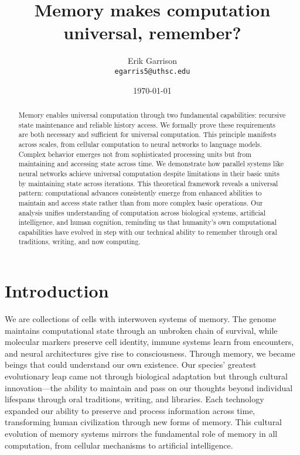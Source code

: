 \documentclass[12pt]{article}
\title{Memory makes computation universal, remember?}
\author{Erik Garrison\\
  \texttt{egarris5@uthsc.edu}\\[1ex]
  }
\date{\today}
\begin{document}
\maketitle

\begin{abstract}
Memory enables universal computation through two fundamental capabilities: recursive state maintenance and reliable history access.
We formally prove these requirements are both necessary and sufficient for universal computation.
This principle manifests across scales, from cellular computation to neural networks to language models.
Complex behavior emerges not from sophisticated processing units but from maintaining and accessing state across time.
We demonstrate how parallel systems like neural networks achieve universal computation despite limitations in their basic units by maintaining state across iterations.
This theoretical framework reveals a universal pattern: computational advances consistently emerge from enhanced abilities to maintain and access state rather than from more complex basic operations.
Our analysis unifies understanding of computation across biological systems, artificial intelligence, and human cognition, reminding us that humanity's own computational capabilities have evolved in step with our technical ability to remember through oral traditions, writing, and now computing.
\end{abstract}

\section{Introduction}

We are collections of cells with interwoven systems of memory.
The genome maintains computational state through an unbroken chain of survival, while molecular markers preserve cell identity, immune systems learn from encounters, and neural architectures give rise to consciousness.
Through memory, we became beings that could understand our own existence.
Our species' greatest evolutionary leap came not through biological adaptation but through cultural innovation---the ability to maintain and pass on our thoughts beyond individual lifespans through oral traditions, writing, and libraries.
Each technology expanded our ability to preserve and process information across time, transforming human civilization through new forms of memory.
This cultural evolution of memory systems mirrors the fundamental role of memory in all computation, from cellular mechanisms to artificial intelligence.
\end{document}
